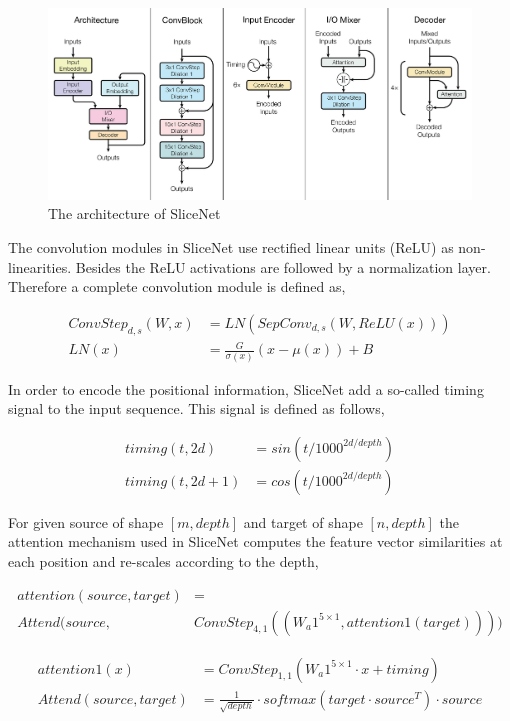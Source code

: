 \documentclass[a4paper]{article}
\begin{document}
\begin{figure}
  \center
  \includegraphics[width=\textwidth]{img/SN}
  \caption{The architecture of SliceNet}
  \label{fig:sn}
\end{figure}


The convolution modules in  SliceNet  use rectified linear units  (ReLU) as non-
linearities. Besides the ReLU activations are followed by a normalization layer.
Therefore a complete convolution module is defined as,


\begin{align*}
  ConvStep_{d,s}(W, x) &= LN (SepConv_{d,s}(W, ReLU (x))) \\
  LN (x) &= \frac{G}{\sigma (x)}(x - \mu (x)) + B
\end{align*}


In order to encode the  positional information, SliceNet  add a so-called timing
signal to the input sequence. This signal is defined as follows,


\begin{align*}
  timing (t, 2d) &= sin (t/1000^{2d/depth}) \\
  timing (t, 2d + 1) &= cos (t/1000^{2d/depth})
\end{align*}


For  given  source of shape $[m,  depth]$  and target  of shape $[n, depth]$ the
attention mechanism used in SliceNet computes the feature vector similarities at
each position and re-scales according to the depth,


\begin{align*}
  attention(source, target) &= \\
  Attend(source, &ConvStep_{4,1}((W_a1^{5 \times 1}, attention1(target))))
\end{align*}


\begin{align*}
  attention1(x) &= ConvStep_{1,1}(W_a1^{5 \times 1} \cdot x + timing) \\
  Attend(source, target) &= \frac{1}{\sqrt{depth}} \cdot
    softmax(target \cdot source^T) \cdot source
\end{align*}
\end{document}

